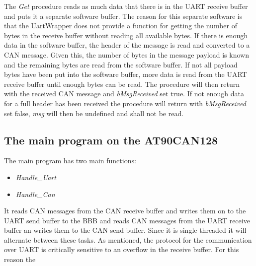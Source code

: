 The \emph{Get} procedure reads as much data that there is in the UART receive buffer and puts it a separate software buffer. The reason for this separate software is that the UartWrapper does not provide a function for getting the number of bytes in the receive buffer without reading all available bytes. \newline
If there is enough data in the software buffer, the header of the message is read and converted to a CAN message. Given this, the number of bytes in the message payload is known and the remaining bytes are read from the software buffer. If not all payload bytes have been put into the software buffer, more data is read from the UART receive buffer until enough bytes can be read. The procedure will then return with the received CAN message and \emph{bMsgReceived} set true. \newline
If not enough data for a full header has been received the procedure will return with \emph{bMsgReceived} set false, \emph{msg} will then be undefined and shall not be read.


\subsection{The main program on the AT90CAN128}
The main program has two main functions:

\begin{itemize}
   \item { \emph{Handle_Uart}} 
   \item { \emph{Handle_Can}}
\end{itemize}
 It reads CAN messages from the CAN receive buffer and writes them on to the UART send buffer to the BBB and reads CAN messages from the UART receive buffer an writes them to the CAN send buffer. Since it is single threaded it will alternate between these tasks. \newline
As mentioned, the protocol for the communication over UART is critically sensitive to an overflow in the receive buffer. For this reason the 